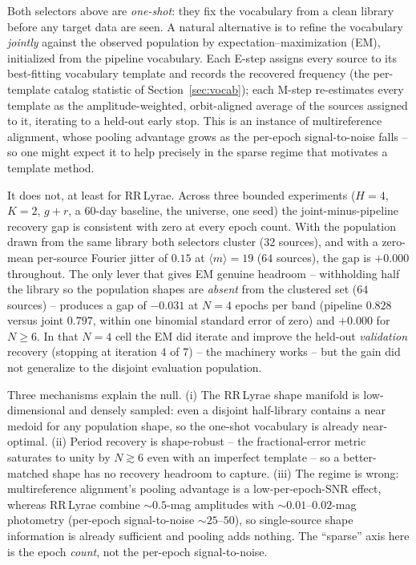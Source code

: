 \documentclass[apj]{emulateapj}
\begin{document}
Both selectors above are \emph{one-shot}: they fix the vocabulary from a clean
library before any target data are seen.  A natural alternative is to refine
the vocabulary \emph{jointly} against the observed population by
expectation--maximization (EM), initialized from the pipeline vocabulary.
Each E-step assigns every source to its best-fitting vocabulary template and
records the recovered frequency (the per-template catalog statistic of
Section~\ref{sec:vocab}); each M-step re-estimates every template as the
amplitude-weighted, orbit-aligned average of the sources assigned to it,
iterating to a held-out early stop.  This is an instance of multireference
alignment, whose pooling advantage grows as the per-epoch signal-to-noise
falls -- so one might expect it to help precisely in the sparse regime that
motivates a template method.

It does not, at least for RR\,Lyrae.  Across three bounded experiments
($H=4$, $K=2$, $g+r$, a $60$-day baseline, the \citet{Sesar_etal_2010}
universe, one seed) the joint-minus-pipeline recovery gap is consistent with
zero at every epoch count.  With the population drawn from the same library
both selectors cluster ($32$ sources), and with a zero-mean per-source Fourier
jitter of $0.15$ at $\langle m\rangle = 19$ ($64$ sources), the gap is
$+0.000$ throughout.  The only lever that gives EM genuine headroom --
withholding half the library so the population shapes are \emph{absent} from
the clustered set ($64$ sources) -- produces a gap of $-0.031$ at $N=4$ epochs
per band (pipeline $0.828$ versus joint $0.797$, within one binomial standard
error of zero) and $+0.000$ for $N \geq 6$.  In that $N=4$ cell the EM did
iterate and improve the held-out \emph{validation} recovery (stopping at
iteration $4$ of $7$) -- the machinery works -- but the gain did not
generalize to the disjoint evaluation population.

Three mechanisms explain the null.  (i) The RR\,Lyrae shape manifold is
low-dimensional and densely sampled: even a disjoint half-library contains a
near medoid for any population shape, so the one-shot vocabulary is already
near-optimal.  (ii) Period recovery is shape-robust -- the fractional-error
metric saturates to unity by $N \gtrsim 6$ even with an imperfect template --
so a better-matched shape has no recovery headroom to capture.  (iii) The
regime is wrong: multireference alignment's pooling advantage is a
low-per-epoch-SNR effect, whereas RR\,Lyrae combine $\sim\!0.5$-mag amplitudes
with $\sim\!0.01$--$0.02$-mag photometry (per-epoch signal-to-noise
$\sim\!25$--$50$), so single-source shape information is already sufficient and
pooling adds nothing.  The ``sparse'' axis here is the epoch \emph{count}, not
the per-epoch signal-to-noise.
\end{document}

